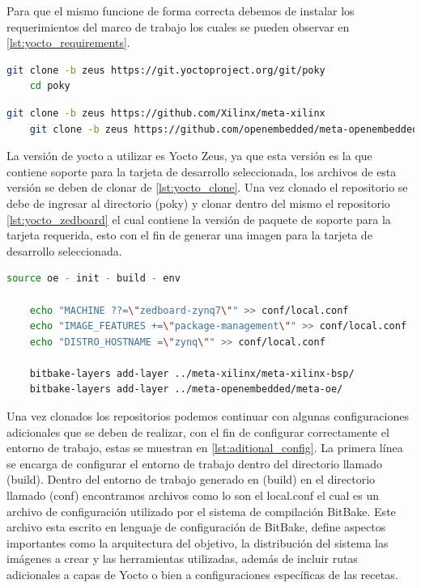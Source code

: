 Para que el mismo funcione de forma correcta debemos de instalar los requerimientos del marco de trabajo los cuales se pueden observar en \ref{lst:yocto_requirements}.

\begin{lstlisting}[language=bash, caption={Version de Yocto}, label=lst:yocto_clone]
    git clone -b zeus https://git.yoctoproject.org/git/poky
    cd poky
\end{lstlisting}

\begin{lstlisting}[language=bash, caption={BSP para Zedboard}, label=lst:yocto_zedboard]
    git clone -b zeus https://github.com/Xilinx/meta-xilinx
    git clone -b zeus https://github.com/openembedded/meta-openembedded.git
\end{lstlisting}

La versión de yocto a utilizar es Yocto Zeus, ya que esta versión es la que contiene soporte para la tarjeta de desarrollo seleccionada, los archivos de esta versión se deben de clonar de \ref{lst:yocto_clone}. Una vez clonado el repositorio se debe de ingresar al directorio (poky) y clonar dentro del mismo el repositorio \ref{lst:yocto_zedboard} el cual contiene la versión de paquete de soporte para la tarjeta requerida, esto con el fin de generar una imagen para la tarjeta de desarrollo seleccionada.

\begin{lstlisting}[language=bash, caption={Configuraciones adicionales, Yocto}, label=lst:aditional_config]
    source oe - init - build - env
    
    echo "MACHINE ??=\"zedboard-zynq7\"" >> conf/local.conf
    echo "IMAGE_FEATURES +=\"package-management\"" >> conf/local.conf
    echo "DISTRO_HOSTNAME =\"zynq\"" >> conf/local.conf
    
    bitbake-layers add-layer ../meta-xilinx/meta-xilinx-bsp/
    bitbake-layers add-layer ../meta-openembedded/meta-oe/
\end{lstlisting}

Una vez clonados los repositorios podemos continuar con algunas configuraciones adicionales que se deben de realizar, con el fin de configurar correctamente el entorno de trabajo, estas se muestran en \ref{lst:aditional_config}. La primera línea se encarga de configurar el entorno de trabajo dentro del directorio llamado (build). Dentro del entorno de trabajo generado en (build) en el directorio llamado (conf) encontramos archivos como lo son el local.conf el cual es un archivo de configuración utilizado por el sistema de compilación BitBake. Este archivo esta escrito en lenguaje de configuración de BitBake, define aspectos importantes como la arquitectura del objetivo, la distribución del sistema las imágenes a crear y las herramientas utilizadas, además de incluir rutas adicionales a capas de Yocto o bien a configuraciones específicas de las recetas. 

